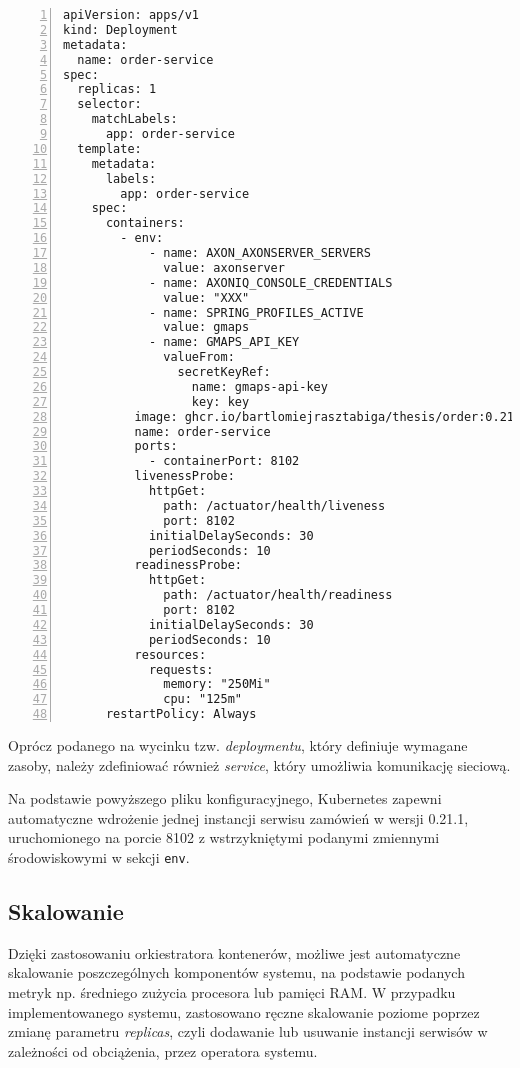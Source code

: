 \begin{lstlisting}[caption={Fragment pliku konfiguracyjnego Kubernetes dla serwisu zamówień},label={lst:deployment-k8s},captionpos=b,numbers=left]
apiVersion: apps/v1
kind: Deployment
metadata:
  name: order-service
spec:
  replicas: 1
  selector:
    matchLabels:
      app: order-service
  template:
    metadata:
      labels:
        app: order-service
    spec:
      containers:
        - env:
            - name: AXON_AXONSERVER_SERVERS
              value: axonserver
            - name: AXONIQ_CONSOLE_CREDENTIALS
              value: "XXX"
            - name: SPRING_PROFILES_ACTIVE
              value: gmaps
            - name: GMAPS_API_KEY
              valueFrom:
                secretKeyRef:
                  name: gmaps-api-key
                  key: key
          image: ghcr.io/bartlomiejrasztabiga/thesis/order:0.21.1
          name: order-service
          ports:
            - containerPort: 8102
          livenessProbe:
            httpGet:
              path: /actuator/health/liveness
              port: 8102
            initialDelaySeconds: 30
            periodSeconds: 10
          readinessProbe:
            httpGet:
              path: /actuator/health/readiness
              port: 8102
            initialDelaySeconds: 30
            periodSeconds: 10
          resources:
            requests:
              memory: "250Mi"
              cpu: "125m"
      restartPolicy: Always
\end{lstlisting}

Oprócz podanego na wycinku tzw. \textit{deploymentu}, który definiuje wymagane zasoby, należy zdefiniować również \textit{service}, który umożliwia komunikację sieciową.

Na podstawie powyższego pliku konfiguracyjnego, Kubernetes zapewni automatyczne wdrożenie jednej instancji serwisu zamówień w wersji 0.21.1, uruchomionego na porcie 8102 z wstrzykniętymi podanymi zmiennymi środowiskowymi w sekcji \texttt{env}. 

\subsection{Skalowanie}

Dzięki zastosowaniu orkiestratora kontenerów, możliwe jest automatyczne skalowanie poszczególnych komponentów systemu, na podstawie podanych metryk np. średniego zużycia procesora lub pamięci RAM. W przypadku implementowanego systemu, zastosowano ręczne skalowanie poziome poprzez zmianę parametru \textit{replicas}, czyli dodawanie lub usuwanie instancji serwisów w zależności od obciążenia, przez operatora systemu.

